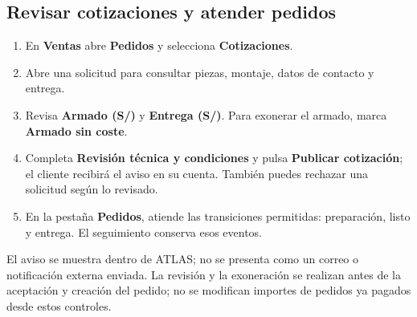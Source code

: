 \documentclass[12pt,letterpaper]{article}
\newcommand{\control}[1]{\textbf{#1}}
\begin{document}
\subsection{Revisar cotizaciones y atender pedidos}
\begin{enumerate}
\item En \control{Ventas} abre \control{Pedidos} y selecciona \control{Cotizaciones}.
\item Abre una solicitud para consultar piezas, montaje, datos de contacto y entrega.
\item Revisa \control{Armado (S/)} y \control{Entrega (S/)}. Para exonerar el armado, marca \control{Armado sin coste}.
\item Completa \control{Revisión técnica y condiciones} y pulsa \control{Publicar cotización}; el cliente recibirá el aviso en su cuenta. También puedes rechazar una solicitud según lo revisado.
\item En la pestaña \control{Pedidos}, atiende las transiciones permitidas: preparación, listo y entrega. El seguimiento conserva esos eventos.
\end{enumerate}
El aviso se muestra dentro de ATLAS; no se presenta como un correo o notificación externa enviada. La revisión y la exoneración se realizan antes de la aceptación y creación del pedido; no se modifican importes de pedidos ya pagados desde estos controles.
\clearpage
\end{document}
